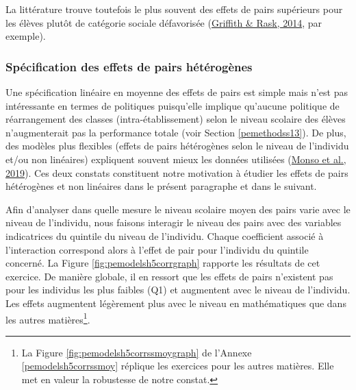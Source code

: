 \documentclass[
]{book}
\begin{document}
La littérature trouve toutefois le plus souvent des effets de pairs supérieurs pour les élèves plutôt de catégorie sociale défavorisée (\protect\hyperlink{ref-GRI:RAS:14}{Griffith \& Rask, 2014}, par exemple).

\hypertarget{peresfrh5}{%
\subsubsection{Spécification des effets de pairs hétérogènes}\label{peresfrh5}}

Une spécification linéaire en moyenne des effets de pairs est simple mais n'est pas intéressante en termes de politiques puisqu'elle implique qu'aucune politique de réarrangement des classes (intra-établissement) selon le niveau scolaire des élèves n'augmenterait pas la performance totale (voir Section \ref{pemethodss13}). De plus, des modèles plus flexibles (effets de pairs hétérogènes selon le niveau de l'individu et/ou non linéaires) expliquent souvent mieux les données utilisées (\protect\hyperlink{ref-MON:eal:19}{Monso et al., 2019}). Ces deux constats constituent notre motivation à étudier les effets de pairs hétérogènes et non linéaires dans le présent paragraphe et dans le suivant.

\quad Afin d'analyser dans quelle mesure le niveau scolaire moyen des pairs varie avec le niveau de l'individu, nous faisons interagir le niveau des pairs avec des variables indicatrices du quintile du niveau de l'individu. Chaque coefficient associé à l'interaction correspond alors à l'effet de pair pour l'individu du quintile concerné.
La Figure \ref{fig:pemodelsh5corrgraph} rapporte les résultats de cet exercice. De manière globale, il en ressort que les effets de pairs n'existent pas pour les individus les plus faibles (Q1) et augmentent avec le niveau de l'individu. Les effets augmentent légèrement plus avec le niveau en mathématiques que dans les autres matières\footnote{La Figure \ref{fig:pemodelsh5corrssmoygraph} de l'Annexe \ref{pemodelsh5corrssmoy} réplique les exercices pour les autres matières. Elle met en valeur la robustesse de notre constat.}.
\end{document}
